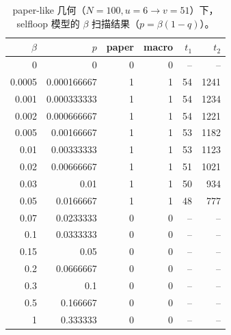 \begin{table}[!htbp]
\centering
\small
\begin{tabular}{rrrrrr}
\toprule
$\beta$ & $p$ & paper & macro & $t_1$ & $t_2$\\
\midrule
0 & 0 & 0 & 0 & -- & --\\
0.0005 & 0.000166667 & 1 & 1 & 54 & 1241\\
0.001 & 0.000333333 & 1 & 1 & 54 & 1234\\
0.002 & 0.000666667 & 1 & 1 & 54 & 1221\\
0.005 & 0.00166667 & 1 & 1 & 53 & 1182\\
0.01 & 0.00333333 & 1 & 1 & 53 & 1123\\
0.02 & 0.00666667 & 1 & 1 & 51 & 1021\\
0.03 & 0.01 & 1 & 1 & 50 & 934\\
0.05 & 0.0166667 & 1 & 1 & 48 & 777\\
0.07 & 0.0233333 & 0 & 0 & -- & --\\
0.1 & 0.0333333 & 0 & 0 & -- & --\\
0.15 & 0.05 & 0 & 0 & -- & --\\
0.2 & 0.0666667 & 0 & 0 & -- & --\\
0.3 & 0.1 & 0 & 0 & -- & --\\
0.5 & 0.166667 & 0 & 0 & -- & --\\
1 & 0.333333 & 0 & 0 & -- & --\\
\bottomrule
\end{tabular}
\caption{paper-like 几何（$N=100,u=6\to v=51$）下，selfloop 模型的 $\beta$ 扫描结果（$p=\beta(1-q)$）。}
\label{tab:selfloop-beta-scan-cn}
\end{table}
